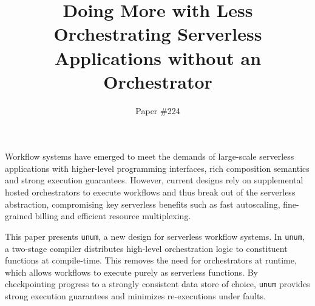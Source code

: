 \documentclass[letterpaper,twocolumn,10pt]{article}
\newcommand{\name}{\texttt{unum}}
\begin{document}

\date{}

\title{Doing More with Less \\ Orchestrating Serverless Applications
without an Orchestrator}

\author{
  Paper \#224
} %

\maketitle
\thispagestyle{empty}

\abstract

Workflow systems have emerged to meet the demands of large-scale serverless
applications with higher-level programming interfaces, rich composition
semantics and strong execution guarantees. However, current designs rely on
supplemental hosted orchestrators to execute workflows and thus break out of
the serverless abstraction, compromising key serverless benefits such as fast
autoscaling, fine-grained billing and efficient resource multiplexing. 

This paper presents \name{}, a new design for serverless workflow systems. 
In \name{}, a two-stage compiler distributes high-level orchestration
logic to constituent functions at compile-time. 
This removes the need for orchestrators at runtime, which allows workflows to 
execute purely as serverless functions. 
By checkpointing progress to a strongly consistent data store 
of choice, \name{} provides strong execution guarantees 
and minimizes re-executions under faults. 
\end{document}
